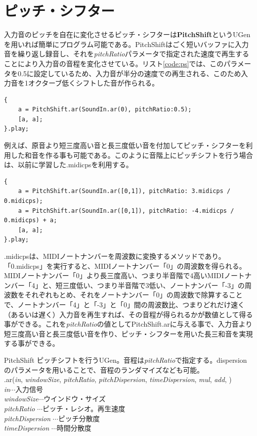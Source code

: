\documentclass{jsarticle}
\begin{document}
\section{ピッチ・シフター}
入力音のピッチを自在に変化させるピッチ・シフターは{\bf PitchShift}というUGenを用いれば簡単にプログラム可能である。PitchShiftはごく短いバッファに入力音を繰り返し録音し、それを{\it pitchRatio}パラメータで指定された速度で再生することにより入力音の音程を変化させている。リスト\ref{code:ps}では、このパラメータを0.5に設定しているため、入力音が半分の速度での再生される、このため入力音を1オクターブ低くシフトした音が作られる。

\begin{lstlisting}[caption=ピッチ・シフター, label=code:ps]
{
	a = PitchShift.ar(SoundIn.ar(0), pitchRatio:0.5);
	[a, a];
}.play;
\end{lstlisting}

例えば、原音より短三度高い音と長三度低い音を付加してピッチ・シフターを利用した和音を作る事も可能である。このように音階上にピッチシフトを行う場合は、以前に学習した.midicpsを利用する。

\begin{lstlisting}[caption=ピッチ・シフターによる和音, label=code:ps_chord]
{
	a = PitchShift.ar(SoundIn.ar([0,1]), pitchRatio: 3.midicps / 0.midicps);
	a = PitchShift.ar(SoundIn.ar([0,1]), pitchRatio: -4.midicps / 0.midicps) + a;
	[a, a];
}.play;
\end{lstlisting}

.midicpsは、MIDIノートナンバーを周波数に変換するメソッドであり。「0.midicps」を実行すると、MIDIノートナンバー「0」の周波数を得られる。MIDIノートナンバー「0」より長三度高い、つまり半音階で4高いMIDIノートナンバー「4」と、短三度低い、つまり半音階で3低い、ノートナンバー「-3」の周波数をそれぞれもとめ、それをノートナンバー「0」の周波数で除算することで、ノートナンバー「4」と「-3」と「0」間の周波数比、つまりどれだけ速く（あるいは遅く）入力音を再生すれば、その音程が得られるかが数値として得る事ができる。これを{\it pitchRatio}の値としてPitchShift.arに与える事で、入力音より短三度高い音と長三度低い音を作り、ピッチ・シフターを用いた長三和音を実現する事ができる。

\begin{itembox}[l]{PitchShift}
{\footnotesize 
ピッチシフトを行うUGen。音程は{\it pitchRatio}で指定する。dispersionのパラメータを用いることで、音程のランダマイズなども可能。\\
.ar({\it in}, {\it windowSize}, {\it pitchRatio}, {\it pitchDispersion}, {\it timeDispersion}, {\it mul}, {\it add}, )\\

{\it in}$\cdots$入力信号\\
{\it windowSize}$\cdots$ウインドウ・サイズ\\
{\it pitchRatio} $\cdots$ピッチ・レシオ。再生速度\\
{\it pitchDispersion} $\cdots$ピッチ分散度\\
{\it timeDispersion} $\cdots$時間分散度\\
}
\end{itembox}
\end{document}

